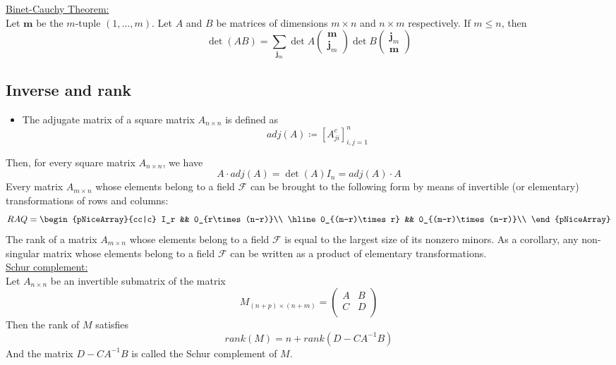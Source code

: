 \documentclass[12pt, openany]{report}
\theoremstyle{definition}
\begin{document}
\underline{Binet-Cauchy Theorem:}\\
Let \(\textbf{m}\) be the \(m\)-tuple \((1,\dots,m)\). Let \(A\) and \(B\) be matrices of dimensions \(m\times n\) and \(n\times m\) respectively. If \(m\le n\), then 
\begin{equation}
    \det(AB) = \sum_{\textbf{j}_m} \det A\begin{pmatrix}
        \textbf{m}\\ \textbf{j}_m
    \end{pmatrix} \det B\begin{pmatrix}
        \textbf{j}_m\\ \textbf{m}
    \end{pmatrix}
\end{equation}
\subsection{Inverse and rank}
\begin{itemize}
    \item The adjugate matrix of a square matrix \(A_{n\times n}\) is defined as \[adj(A) \coloneqq [A_{ji}^c]_{i,j=1}^n\]
\end{itemize}
Then, for every square matrix \(A_{n\times n}\), we have
\begin{equation}
    A\cdot adj(A) = \det(A) I_n = adj(A)\cdot A
\end{equation}
Every matrix \(A_{m\times n}\) whose elements belong to a field \(\mathcal{F}\) can be brought to the following form by means of invertible (or elementary) transformations of rows and columns:
\begin{equation}
    RAQ = \begin{pNiceArray}{cc|c}
    I_r && 0_{r\times (n-r)}\\
  \hline
  0_{(m-r)\times r} && 0_{(m-r)\times (n-r)}\\
\end{pNiceArray}
\end{equation}
The rank of a matrix \(A_{m\times n}\) whose elements belong to a field \(\mathcal{F}\) is equal to the largest size of its nonzero minors. As a corollary, any non-singular matrix whose elements belong to a field \(\mathcal{F}\) can be written as a product of elementary transformations.\\

\underline{Schur complement:}\\
Let \(A_{n\times n}\) be an invertible submatrix of the matrix \[M_{(n+p)\times (n+m)} = \begin{pmatrix}
    A & B\\ C & D\\
\end{pmatrix}\]
Then the rank of \(M\) satisfies 
\begin{equation}
    rank(M) = n + rank(D-CA^{-1}B)
\end{equation}
And the matrix \(D-CA^{-1}B\) is called the Schur complement of \(M\). 
\end{document}
